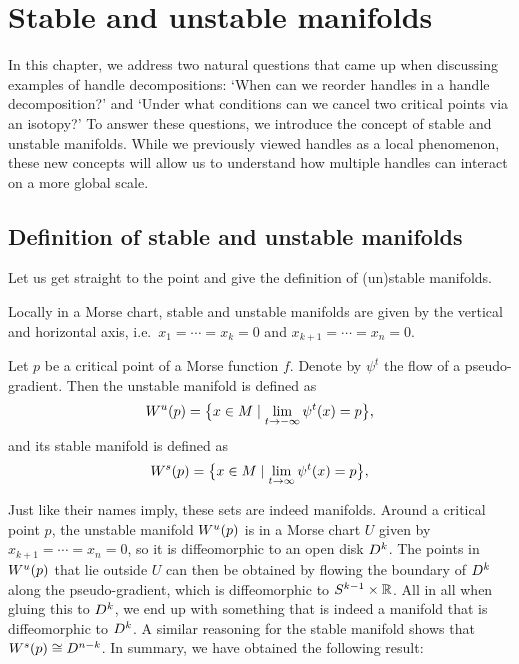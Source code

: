 \chapter{Stable and unstable manifolds}
\label{chap:stable-and-unstable-manifolds}


In this chapter, we address two natural questions that came up when discussing examples of handle decompositions: `When can we reorder handles in a handle decomposition?' and `Under what conditions can we cancel two critical points via an isotopy?'
To answer these questions, we introduce the concept of stable and unstable manifolds.
While we previously viewed handles as a local phenomenon, these new concepts will allow us to understand how multiple handles can interact on a more global scale.

\section{Definition of stable and unstable manifolds}
Let us get straight to the point and give the definition of (un)stable manifolds.
\begin{marginfigure}
    \centering
    \caption{Locally in a Morse chart, stable and unstable manifolds are given by the vertical and horizontal axis, i.e.\ $ x_1= \cdots= x_k = 0$ and $x_{k+1}= \cdots= x_n = 0$.}
    \label{fig:stable-and-unstable-manifolds-are-manifiolds}
\end{marginfigure}
\begin{definition}
    Let $p$ be a critical point of a Morse function $f$.
    Denote by $\psi^{t}$ the flow of a pseudo-gradient.
    Then the unstable manifold is defined as
    \[
        W^u(p) = \big\{x \in M  \mid  \lim_{t \to -\infty} \psi^{t} (x)  = p\big\} 
    ,\] 
    and its stable manifold is defined as
    \[
        W^s(p) = \big\{x \in M  \mid  \lim_{t \to \infty} \psi^{t} (x)  = p\big\} 
    ,\] 
\end{definition}
Just like their names imply, these sets are indeed manifolds.
Around a critical point $p$, the unstable manifold $W^u(p)$ is in a Morse chart $U$ given by $x_{k+1} = \cdots = x_n = 0$, so it is diffeomorphic to an open disk $D^{k}$.
The points in $W^u(p)$ that lie outside $U$ can then be obtained by flowing the boundary of $D^{k}$ along the pseudo-gradient, which is diffeomorphic to $S^{k-1} \times \mathbb{R}$. All in all when gluing this to $D^{k}$, we end up with something that is indeed a manifold that is diffeomorphic to $D^{k}$.
A similar reasoning for the stable manifold shows that $W^s(p) \cong D^{n - k}$.
In summary, we have obtained the following result:

